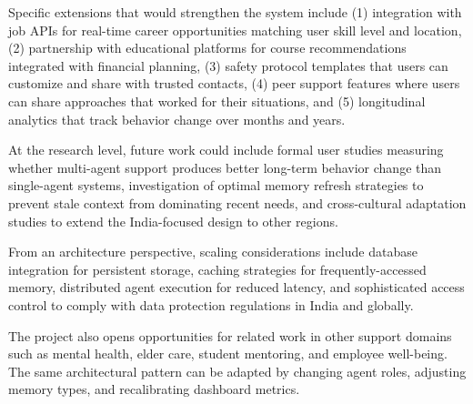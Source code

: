 \documentclass[oneside,a4paper,12pt]{report}
\begin{document}
Specific extensions that would strengthen the system include (1) integration with job APIs for real-time career opportunities matching user skill level and location, (2) partnership with educational platforms for course recommendations integrated with financial planning, (3) safety protocol templates that users can customize and share with trusted contacts, (4) peer support features where users can share approaches that worked for their situations, and (5) longitudinal analytics that track behavior change over months and years.

At the research level, future work could include formal user studies measuring whether multi-agent support produces better long-term behavior change than single-agent systems, investigation of optimal memory refresh strategies to prevent stale context from dominating recent needs, and cross-cultural adaptation studies to extend the India-focused design to other regions.

From an architecture perspective, scaling considerations include database integration for persistent storage, caching strategies for frequently-accessed memory, distributed agent execution for reduced latency, and sophisticated access control to comply with data protection regulations in India and globally.

The project also opens opportunities for related work in other support domains such as mental health, elder care, student mentoring, and employee well-being. The same architectural pattern can be adapted by changing agent roles, adjusting memory types, and recalibrating dashboard metrics.
\end{document}
